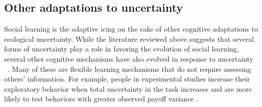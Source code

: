 \documentclass[letterpaper,11.5pt]{scrartcl}
\newcommand{\cm}[1]{{\textcolor{mypurple} {({\tiny CM:} #1)}}}
\begin{document}
\subsection{Other adaptations to uncertainty} 

Social learning is the adaptive icing on the cake of other cognitive adaptations to ecological uncertainty. 
While the literature reviewed above suggests that several forms of uncertainty play a role in favoring the evolution of social learning, several other cognitive mechanisms have also evolved in response to uncertainty ~\cite{volz2012}. Many of these are flexible learning mechanisms that do not require assessing others' information. For example, people in experimental studies increase their exploratory behavior when total uncertainty in the task increases and are more likely to test %
behaviors with greater observed payoff variance \cite{Wilson2014,Gershman2019}.
\end{document}
